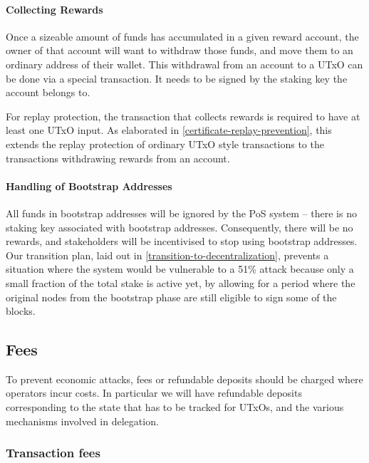 \documentclass[11pt,a4paper]{article}
\begin{document}
\paragraph{Collecting Rewards}

Once a sizeable amount of funds has accumulated in a given reward
account, the owner of that account will want to withdraw those funds,
and move them to an ordinary address of their wallet. This withdrawal
from an account to a UTxO can be done via a special transaction. It
needs to be signed by the staking key the account belongs to.

For replay protection, the transaction that collects rewards is required to have
at least one UTxO input. As elaborated in \cref{certificate-replay-prevention},
this extends the replay protection of ordinary UTxO style transactions to the
transactions withdrawing rewards from an account.

\paragraph{Handling of Bootstrap Addresses}
\label{handling-of-bootstrap-addresses}

All funds in bootstrap addresses will be ignored by the PoS system --
there is no staking key associated with bootstrap
addresses. Consequently, there will be no rewards, and stakeholders
will be incentivised to stop using bootstrap addresses. Our transition
plan, laid out in \cref{transition-to-decentralization}, prevents a
situation where the system would be vulnerable to a 51\% attack
because only a small fraction of the total stake is active yet, by
allowing for a period where the original nodes from the bootstrap
phase are still eligible to sign some of the blocks.

\subsection{Fees}
\label{fees}

To prevent economic attacks, fees or refundable deposits should be
charged where operators incur costs. In particular we will have
refundable deposits corresponding to the state that has to be tracked
for UTxOs, and the various mechanisms involved in delegation.

\subsubsection{Transaction fees}
\label{transaction-fees}
\end{document}

